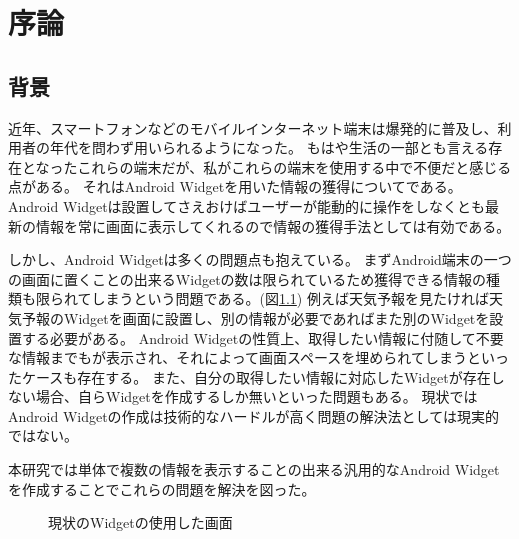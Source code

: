 \chapter{序論}
\label{chap:introduction}
\section{背景}


近年、スマートフォンなどのモバイルインターネット端末は爆発的に普及し、利用者の年代を問わず用いられるようになった。
もはや生活の一部とも言える存在となったこれらの端末だが、私がこれらの端末を使用する中で不便だと感じる点がある。
それはAndroid Widgetを用いた情報の獲得についてである。
Android Widgetは設置してさえおけばユーザーが能動的に操作をしなくとも最新の情報を常に画面に表示してくれるので情報の獲得手法としては有効である。

しかし、Android Widgetは多くの問題点も抱えている。
まずAndroid端末の一つの画面に置くことの出来るWidgetの数は限られているため獲得できる情報の種類も限られてしまうという問題である。(図\ref{fig:old_widget})
例えば天気予報を見たければ天気予報のWidgetを画面に設置し、別の情報が必要であればまた別のWidgetを設置する必要がある。
Android Widgetの性質上、取得したい情報に付随して不要な情報までもが表示され、それによって画面スペースを埋められてしまうといったケースも存在する。
また、自分の取得したい情報に対応したWidgetが存在しない場合、自らWidgetを作成するしか無いといった問題もある。
現状ではAndroid Widgetの作成は技術的なハードルが高く問題の解決法としては現実的ではない。

本研究では単体で複数の情報を表示することの出来る汎用的なAndroid Widgetを作成することでこれらの問題を解決を図った。

\begin{figure}[htbp]
  \begin{minipage}{\hsize}
    \begin{center}
    \end{center}
    \caption{現状のWidgetの使用した画面}
    \label{fig:old_widget}
  \end{minipage}
\end{figure}

